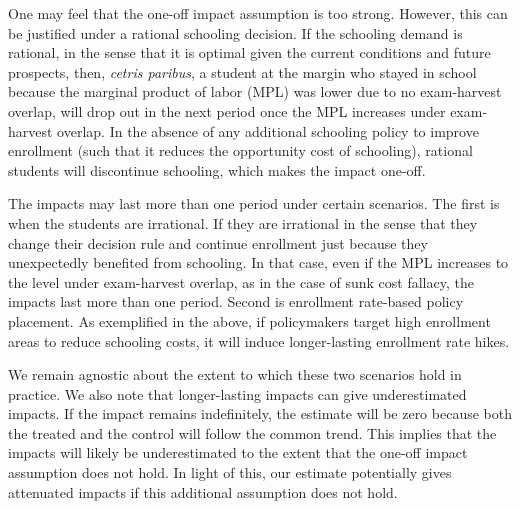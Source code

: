 \documentclass[12pt,letterpaper]{article}\usepackage[margin=1in]{geometry}
\newcommand{\0}{\ensuremath{\mbox{\boldmath $0$}}}
\begin{document}
One may feel that the one-off impact assumption is too strong. However, this can be justified under a rational schooling decision. If the schooling demand is rational, in the sense that it is optimal given the current conditions and future prospects, then, \textit{cetris paribus}, a student at the margin who stayed in school because the marginal product of labor (MPL) was lower due to no exam-harvest overlap, will drop out in the next period once the MPL increases under exam-harvest overlap. In the absence of any additional schooling policy to improve enrollment (such that it reduces the opportunity cost of schooling), rational students will discontinue schooling, which makes the impact one-off. 

The impacts may last more than one period under certain scenarios. The first is when the students are irrational. If they are irrational in the sense that they change their decision rule and continue enrollment just because they unexpectedly benefited from schooling. In that case, even if the MPL increases to the level under exam-harvest overlap, as in the case of sunk cost fallacy, the impacts last more than one period. Second is enrollment rate-based policy placement. As exemplified in the above, if policymakers target high enrollment areas to reduce schooling costs, it will induce longer-lasting enrollment rate hikes. 

We remain agnostic about the extent to which these two scenarios hold in practice. We also note that longer-lasting impacts can give underestimated impacts. If the impact remains indefinitely, the estimate will be zero because both the treated and the control will follow the common trend. This implies that the impacts will likely be underestimated to the extent that the one-off impact assumption does not hold. In light of this, our estimate potentially gives attenuated impacts if this additional assumption does not hold.

\end{document}
